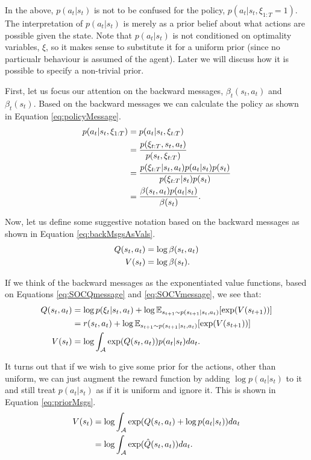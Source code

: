 \documentclass{report}
\numberwithin{equation}{section}
\numberwithin{figure}{section}
\numberwithin{table}{section}
\numberwithin{algorithm}{section}
\begin{document}
In the above, $p(a_t|s_t)$ is not to be confused for the policy, 
$p(a_t|s_t, \xi_{1:T}=1)$. The interpretation of $p(a_t|s_t)$ 
is merely as a prior belief about what actions are 
possible given the state. 
Note that $p(a_t|s_t)$ is not conditioned on optimality variables, 
$\xi$, so it makes sense to substitute it for a uniform prior 
(since no particualr behaviour is assumed of the agent). Later 
we will discuss how it is possible to specify a non-trivial prior.


First, let us focus our attention on the backward messages, 
$\beta_t(s_t, a_t)$ and $\beta_t(s_t)$. 
Based on the backward messages we can calculate the policy as 
shown in Equation \ref{eq:policyMessage}.
\begin{align}\label{eq:policyMessage}
  p(a_t|s_t,\xi_{1:T})&=p(a_t|s_t,\xi_{t:T})\notag\\
  &=\frac{p(\xi_{t:T},s_t,a_t)}{p(s_t,\xi_{t:T})}\notag\\
  &=\frac{p(\xi_{t:T}|s_t, a_t)p(a_t|s_t)p(s_t)}{p(\xi_{t:T}|s_t)p(s_t)}\notag\\
  &=\frac{\beta(s_t, a_t)p(a_t|s_t)}{\beta(s_t)}.
\end{align}

Now, let us define some 
suggestive notation based on the backward messages as shown 
in Equation \ref{eq:backMsgsAsVals}.
\begin{align}\label{eq:backMsgsAsVals}
  Q(s_t, a_t)&=\log \beta(s_t, a_t)\notag\\
  V(s_t)&=\log \beta(s_t).
\end{align}

If we think of the backward messages as the exponentiated 
value functions, based on Equations \ref{eq:SOCQmessage} and 
\ref{eq:SOCVmessage}, we see that:
\begin{align}\label{eq:badVals}
  Q(s_t, a_t)&=\log p(\xi_t|s_t, a_t) + \log\mathbb{E}_{s_{t+1}\sim p(s_{t+1}|s_t, a_t)}[\exp (V(s_{t+1}))]\notag\\
  &=r(s_t, a_t) + \log\mathbb{E}_{s_{t+1}\sim p(s_{t+1}|s_t, a_t)}[\exp (V(s_{t+1}))]\notag\\
  V(s_t)&=\log \int_{\mathcal{A}}\exp (Q(s_t, a_t))p(a_t|s_t)da_t.
\end{align}

It turns out that if we wish to give some prior for the actions, 
other than uniform, we can just augment the reward function 
by adding $\log p(a_t|s_t)$ to it and still treat $p(a_t|s_t)$ 
as if it is uniform and ignore it. This is shown in Equation 
\ref{eq:priorMsgs}.
\begin{align}\label{eq:priorMsgs}
  V(s_t)&=\log \int_{\mathcal{A}}\exp (Q(s_t, a_t) + \log p(a_t|s_t))da_t\notag\\
  &=\log \int_{\mathcal{A}}\exp (\hat{Q}(s_t, a_t))da_t.
\end{align}
\end{document}
